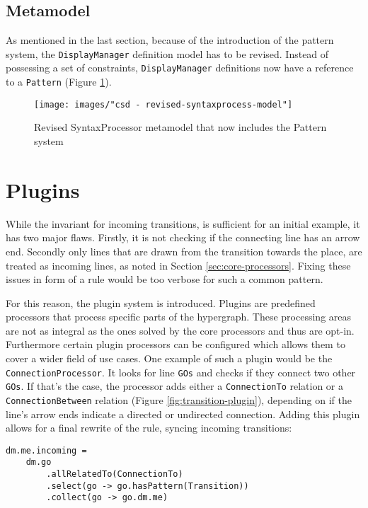 \subsection{Metamodel}
As mentioned in the last section, because of the introduction of the pattern system, the \texttt{DisplayManager} definition model has to be revised. Instead of possessing a set of constraints, \texttt{DisplayManager} definitions now have a reference to a \texttt{Pattern} (Figure \ref{fig:revised-syntax-model}).

\begin{figure}
  \centering
  \texttt{[image: images/"csd - revised-syntaxprocess-model"]}
  \caption{Revised SyntaxProcessor metamodel that now includes the Pattern system}
  \label{fig:revised-syntax-model}
\end{figure}


\section{Plugins}
\label{sec:plugins}
While the invariant for incoming transitions, is sufficient for an initial example, it has two major flaws. Firstly, it is not checking if the connecting line has an arrow end. Secondly only lines that are drawn from the transition towards the place, are treated as incoming lines, as noted in Section \ref{sec:core-processors}. Fixing these issues in form of a rule would be too verbose for such a common pattern.

For this reason, the plugin system is introduced. Plugins are predefined processors that process specific parts of the hypergraph. These processing areas are not as integral as the ones solved by the core processors and thus are opt-in. Furthermore certain plugin processors can be configured which allows them to cover a wider field of use cases. One example of such a plugin would be the \texttt{ConnectionProcessor}. It looks for line \texttt{GOs} and checks if they connect two other \texttt{GOs}. If that's the case, the processor adds either a \texttt{ConnectionTo} relation or a \texttt{ConnectionBetween} relation (Figure \ref{fig:transition-plugin}), depending on if the line's arrow ends indicate a directed or undirected connection. Adding this plugin allows for a final rewrite of the rule, syncing incoming transitions:

\begin{lstlisting}[captionpos=b,caption={Final iteration of the place incoming transition rule}]
dm.me.incoming = 
    dm.go
        .allRelatedTo(ConnectionTo)
        .select(go -> go.hasPattern(Transition))
        .collect(go -> go.dm.me)
\end{lstlisting}


